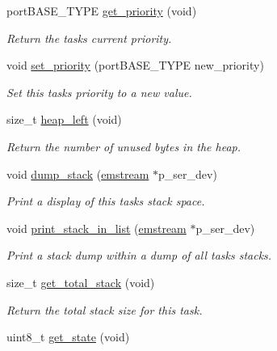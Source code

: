 \begin{DoxyCompactItemize}
port\+B\+A\+S\+E\+\_\+\+T\+Y\+PE \mbox{\hyperlink{class_task_base_a1f26fc9564898da36d2355095c204340}{get\+\_\+priority}} (void)
\begin{DoxyCompactList}\small\item\em Return the task\textquotesingle{}s current priority. \end{DoxyCompactList}\item 
void \mbox{\hyperlink{class_task_base_a1a6f54b0b07cf27d5764c4dca5ec5fcf}{set\+\_\+priority}} (port\+B\+A\+S\+E\+\_\+\+T\+Y\+PE new\+\_\+priority)
\begin{DoxyCompactList}\small\item\em Set this task\textquotesingle{}s priority to a new value. \end{DoxyCompactList}\item 
size\+\_\+t \mbox{\hyperlink{class_task_base_a822796dba0ef4d457608363507d65f5a}{heap\+\_\+left}} (void)
\begin{DoxyCompactList}\small\item\em Return the number of unused bytes in the heap. \end{DoxyCompactList}\item 
void \mbox{\hyperlink{class_task_base_a9e228e424048594a935cd31ae9e0eeb3}{dump\+\_\+stack}} (\mbox{\hyperlink{classemstream}{emstream}} $\ast$p\+\_\+ser\+\_\+dev)
\begin{DoxyCompactList}\small\item\em Print a display of this task\textquotesingle{}s stack space. \end{DoxyCompactList}\item 
void \mbox{\hyperlink{class_task_base_a441138caa57e35f58f31dc4d960580d9}{print\+\_\+stack\+\_\+in\+\_\+list}} (\mbox{\hyperlink{classemstream}{emstream}} $\ast$p\+\_\+ser\+\_\+dev)
\begin{DoxyCompactList}\small\item\em Print a stack dump within a dump of all tasks\textquotesingle{} stacks. \end{DoxyCompactList}\item 
size\+\_\+t \mbox{\hyperlink{class_task_base_aa3979e41ecb8f646f12d4283d87f93df}{get\+\_\+total\+\_\+stack}} (void)
\begin{DoxyCompactList}\small\item\em Return the total stack size for this task. \end{DoxyCompactList}\item 
uint8\+\_\+t \mbox{\hyperlink{class_task_base_ae4f412b0911d4cf84dad9169a10c46e0}{get\+\_\+state}} (void)

\end{DoxyCompactItemize}
